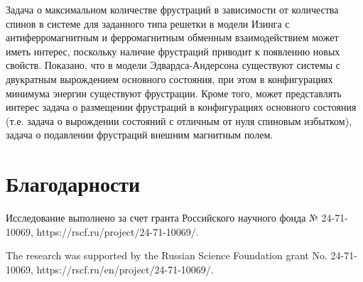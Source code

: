 \documentclass[utf8, babel, sor, jor, amsmath, amssymb, reprint]{elsarticle} %
\begin{document}
Задача о максимальном количестве фрустраций в зависимости от количества спинов в системе для заданного типа решетки в модели Изинга с антиферромагнитным и ферромагнитным обменным взаимодействием может иметь интерес, поскольку наличие фрустраций приводит к появлению новых свойств. Показано, что в модели Эдвардса-Андерсона существуют системы с двукратным вырождением основного состояния, при этом в конфигурациях минимума энергии существуют фрустрации. Кроме того, может представлять интерес задача о размещении фрустраций в конфигурациях основного состояния (т.е. задача о вырождении состояний с отличным от нуля спиновым избытком), задача о подавлении фрустраций внешним магнитным полем. 


\section{Благодарности}

Исследование выполнено за счет гранта Российского научного фонда № 24-71-10069, https://rscf.ru/project/24-71-10069/.

The research was supported by the Russian Science Foundation grant No. 24-71-10069, https://rscf.ru/en/project/24-71-10069/.


\end{document}
